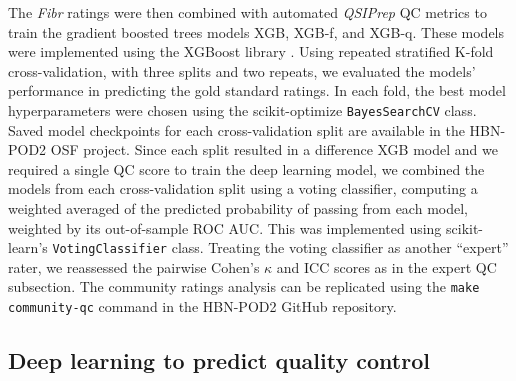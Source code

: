 \documentclass[fleqn,10pt]{wlscirep}
\begin{document}
The \emph{Fibr} ratings were then combined with automated \emph{QSIPrep} QC
metrics to train the gradient boosted trees models XGB, XGB-f, and XGB-q. These
models were implemented using the XGBoost library \cite{xgboost}. Using repeated
stratified K-fold cross-validation, with three splits and two repeats, we
evaluated the models' performance in predicting the gold standard ratings. In
each fold, the best model hyperparameters were chosen using the scikit-optimize
\cite{scikit-optimize} \texttt{BayesSearchCV} class. Saved model checkpoints for
each cross-validation split are available in the HBN-POD2 OSF project. Since
each split resulted in a difference XGB model and we required a single QC score
to train the deep learning model, we combined the models from each
cross-validation split using a voting classifier, computing a weighted averaged
of the predicted probability of passing from each model, weighted by its
out-of-sample ROC AUC. This was implemented using scikit-learn's
\texttt{VotingClassifier} class. Treating the voting classifier as another
``expert'' rater, we reassessed the pairwise Cohen's $\kappa$ and ICC scores as
in the expert QC subsection. The community ratings analysis can be replicated
using the \texttt{make community-qc} command in the HBN-POD2 GitHub repository.

\subsection*{Deep learning to predict quality control}
\end{document}
